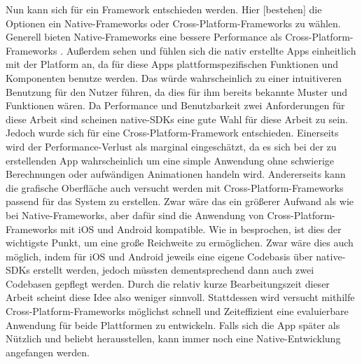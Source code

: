 \myNewSection
Nun kann sich für ein Framework entschieden werden. %
Hier [bestehen] die Optionen ein Native-Frameworks oder Cross-Platform-Frameworks zu wählen.\newline%
	Generell bieten Native-Frameworks eine bessere Performance als Cross-Platform-Frameworks \cite{tech_performanceReactNativeVsFlutter1, tech_performanceReactNativeVsFlutter2}. %
	Außerdem sehen und fühlen sich die nativ erstellte Apps einheitlich mit der Platform an, da für diese Apps plattformspezifischen Funktionen und Komponenten benutze werden.
		Das würde wahrscheinlich zu einer intuitiveren Benutzung für den Nutzer führen, da dies für ihm bereits bekannte Muster und Funktionen wären. %
		Da Performance und Benutzbarkeit zwei Anforderungen für diese Arbeit sind scheinen native-SDKs eine gute Wahl für diese Arbeit zu sein.\newline%
	Jedoch wurde sich für eine Cross-Platform-Framework entschieden. %
		Einerseits wird der Performance-Verlust als marginal eingeschätzt, da es sich bei der zu erstellenden App wahrscheinlich um eine simple Anwendung ohne schwierige Berechnungen oder aufwändigen Animationen handeln wird. 
		Andererseits kann die grafische Oberfläche auch versucht werden mit Cross-Platform-Frameworks passend für das System zu erstellen. Zwar wäre das ein größerer Aufwand als wie bei Native-Frameworks,
		aber dafür sind die Anwendung von Cross-Platform-Frameworks mit iOS und Android kompatible. Wie in  besprochen, ist dies der wichtigste Punkt, um eine große Reichweite zu ermöglichen. Zwar wäre dies auch möglich, indem für iOS und Android jeweils eine eigene Codebasis über native-SDKs erstellt werden, jedoch müssten dementsprechend dann auch zwei Codebasen gepflegt werden. Durch die relativ kurze Bearbeitungszeit dieser Arbeit scheint diese Idee also weniger sinnvoll. Stattdessen wird versucht mithilfe Cross-Platform-Frameworks möglichst schnell und Zeiteffizient eine evaluierbare Anwendung für beide Plattformen zu entwickeln. Falls sich die App später als Nützlich und beliebt herausstellen, kann immer noch eine Native-Entwicklung angefangen werden.
	
